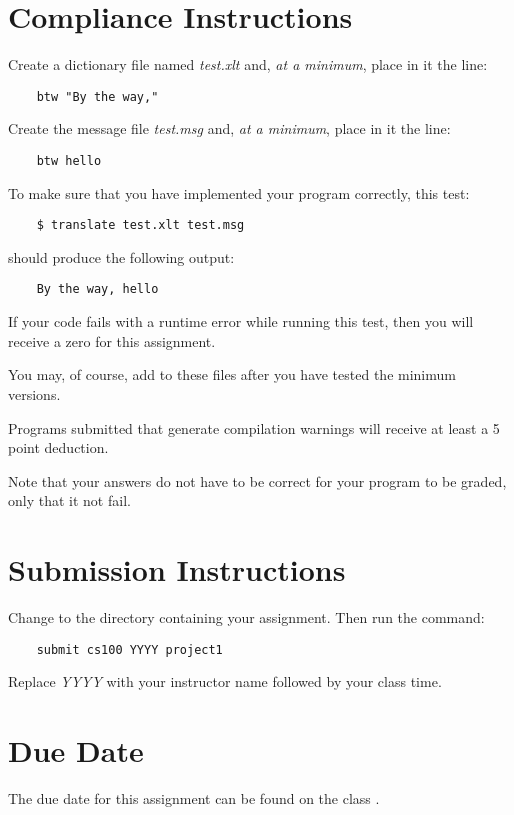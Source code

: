 \documentclass[12pt]{article}
\begin{document}
\section*{Compliance Instructions}

Create a dictionary file named {\it test.xlt} and, 
{\it at a minimum},
place in it the line:

\begin{verbatim}
    btw "By the way,"
\end{verbatim}

Create the message file {\it test.msg} and,
{\it at a minimum},
place in it the line:

\begin{verbatim}
    btw hello
\end{verbatim}

To make sure that you have implemented your
program correctly,  this test:

\begin{verbatim}
    $ translate test.xlt test.msg
\end{verbatim}

should produce the following output:

\begin{verbatim}
    By the way, hello
\end{verbatim}

\color{red}
If your code fails with a runtime error while running this test,
then you will
receive a zero for this assignment.
\color{black}

You may, of course, add to these files after you have tested the
minimum versions.

Programs submitted that generate compilation warnings will receive at
least a 5 point deduction.

Note that your answers do not have to be correct for your program to be graded,
only that it not fail.

\section*{Submission Instructions}

Change to the directory containing your assignment. 
Then run the command:

\begin{verbatim}
    submit cs100 YYYY project1
\end{verbatim}

Replace {\it YYYY} with your instructor name followed by your class time.

\section*{Due Date}

The due date for this assignment can be found on the class
.
\end{document}
